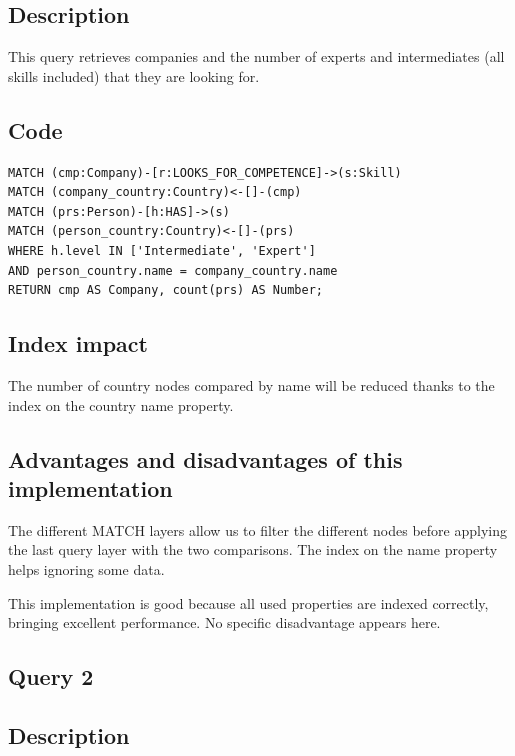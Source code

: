 \documentclass[a4paper, 11pt, titlepage]{article}
\begin{document}
\subsection* {Description}

\noindent
This query retrieves companies and the number of experts and intermediates (all skills included) that they are looking for.


\subsection* {Code}

\begin{verbatim}
MATCH (cmp:Company)-[r:LOOKS_FOR_COMPETENCE]->(s:Skill)
MATCH (company_country:Country)<-[]-(cmp)
MATCH (prs:Person)-[h:HAS]->(s)
MATCH (person_country:Country)<-[]-(prs)
WHERE h.level IN ['Intermediate', 'Expert'] 
AND person_country.name = company_country.name
RETURN cmp AS Company, count(prs) AS Number;
\end{verbatim}


\subsection* {Index impact}

\noindent
The number of country nodes compared by name will be reduced thanks to the index on the country name property.



\subsection* {Advantages and disadvantages of this implementation}

\noindent
The different MATCH layers allow us to filter the different nodes before applying the last query layer with the two comparisons. The index on the name property helps ignoring some data.

\noindent
This implementation is good because all used properties are indexed correctly, bringing excellent performance. No specific disadvantage appears here.





\subsection {Query 2}

\subsection* {Description}
\end{document}

